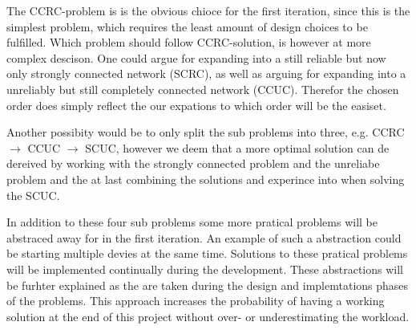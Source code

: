 \bigskip \noindent
The CCRC-problem is is the obvious chioce for the first iteration, since this is the simplest problem, which requires the least amount of design choices to be fulfilled.
Which problem should follow CCRC-solution, is however at more complex descison.
One could argue for expanding into a still reliable but now only strongly connected network (SCRC), as well as arguing for expanding into a unreliably but still completely connected network (CCUC).
Therefor the chosen order does simply reflect the our expations to which order will be the easiset.

Another possibity would be to only split the sub problems into three, e.g. CCRC $\rightarrow$ CCUC $\rightarrow$ SCUC, however we deem that a more optimal solution can de dereived by working with the strongly connected problem and the unreliabe problem and the at last combining the solutions and experince into when solving the SCUC.

In addition to these four sub problems some more pratical problems will be abstraced away for in the first iteration.
An example of such a abstraction could be starting multiple devies at the same time.
Solutions to these pratical problems will be implemented continually during the development. 
These abstractions will be furhter explained as the are taken during the design and implemtations phases of the problems.
This approach increases the probability of having a working solution at the end of this project without over- or underestimating the workload.
